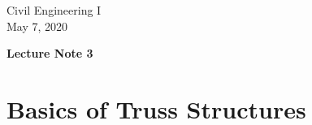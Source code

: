 \documentclass[10pt,a4j]{article}
\newlength{\minitwocolumn}
\begin{document}
\newcommand{\fat}[1]{\mbox{\boldmath $#1$}}
\newcommand{\D}{\partial}
\newcommand{\w}{\omega}
\newcommand{\ga}{\alpha}
\newcommand{\gb}{\beta}
\newcommand{\gx}{\xi}
\newcommand{\gz}{\zeta}
\newcommand{\vhat}[1]{\hat{\fat{#1}}}
\newcommand{\spc}{\vspace{0.7\baselineskip}}
\newcommand{\halfspc}{\vspace{0.3\baselineskip}}

\newcommand{\twofig}[2]
 {
   \begin{figure}
     \begin{minipage}[t]{\minitwocolumn}
         \begin{center}   #1
         \end{center}
     \end{minipage}
         \hspace{\columnsep}
     \begin{minipage}[t]{\minitwocolumn}
         \begin{center} #2
         \end{center}
     \end{minipage}
   \end{figure}
 }
\begin{flushright}
	Civil Engineering I \\
	May 7, 2020
\end{flushright}
\begin{center}
	{\Large \bf Lecture Note 3 }
\end{center}
\setcounter{section}{2}
\section{Basics of Truss Structures}
\end{document}
